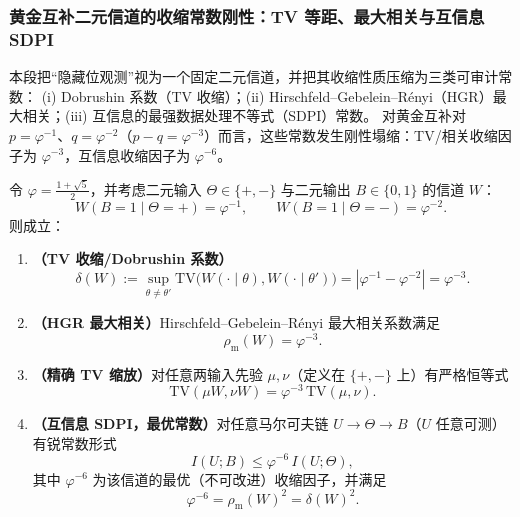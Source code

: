 \subsubsection{黄金互补二元信道的收缩常数刚性：TV 等距、最大相关与互信息 SDPI}\label{subsubsec:pom-golden-channel-contraction-sdpi}

本段把“隐藏位观测”视为一个固定二元信道，并把其收缩性质压缩为三类可审计常数：
(i) Dobrushin 系数（TV 收缩）；(ii) Hirschfeld--Gebelein--Rényi（HGR）最大相关；(iii) 互信息的最强数据处理不等式（SDPI）常数。
对黄金互补对 \(p=\varphi^{-1}\)、\(q=\varphi^{-2}\)（\(p-q=\varphi^{-3}\)）而言，这些常数发生刚性塌缩：TV/相关收缩因子为 \(\varphi^{-3}\)，互信息收缩因子为 \(\varphi^{-6}\)。

\begin{theorem}[黄金互补二元信道的收缩常数刚性：\texorpdfstring{$\delta=\rho_{\mathrm{m}}=\varphi^{-3}$}{delta=rho_m=phi^{-3}} 与 \texorpdfstring{$I$}{I}-收缩 \texorpdfstring{$\varphi^{-6}$}{phi^{-6}}]\label{thm:pom-golden-binary-channel-contraction}
令 \(\varphi=\frac{1+\sqrt5}{2}\)，并考虑二元输入 \(\Theta\in\{+,-\}\) 与二元输出 \(B\in\{0,1\}\) 的信道 \(W\)：
\[
W(B=1\mid \Theta=+)=\varphi^{-1},\qquad
W(B=1\mid \Theta=-)=\varphi^{-2}.
\]
则成立：
\begin{enumerate}
  \item \textbf{（TV 收缩/Dobrushin 系数）}
  \[
  \delta(W)
  :=\sup_{\theta\neq\theta'}\mathrm{TV}\bigl(W(\cdot\mid\theta),W(\cdot\mid\theta')\bigr)
  =|\varphi^{-1}-\varphi^{-2}|
  =\varphi^{-3}.
  \]
  \item \textbf{（HGR 最大相关）}Hirschfeld--Gebelein--Rényi 最大相关系数满足
  \[
  \rho_{\mathrm{m}}(W)=\varphi^{-3}.
  \]
  \item \textbf{（精确 TV 缩放）}对任意两输入先验 \(\mu,\nu\)（定义在 \(\{+,-\}\) 上）有严格恒等式
  \[
  \mathrm{TV}(\mu W,\nu W)=\varphi^{-3}\,\mathrm{TV}(\mu,\nu).
  \]
  \item \textbf{（互信息 SDPI，最优常数）}对任意马尔可夫链 \(U\to \Theta\to B\)（\(U\) 任意可测）有锐常数形式
  \[
  I(U;B)\le \varphi^{-6}\,I(U;\Theta),
  \]
  其中 \(\varphi^{-6}\) 为该信道的最优（不可改进）收缩因子，并满足
  \[
  \varphi^{-6}=\rho_{\mathrm{m}}(W)^2=\delta(W)^2.
  \]
\end{enumerate}
\end{theorem}

